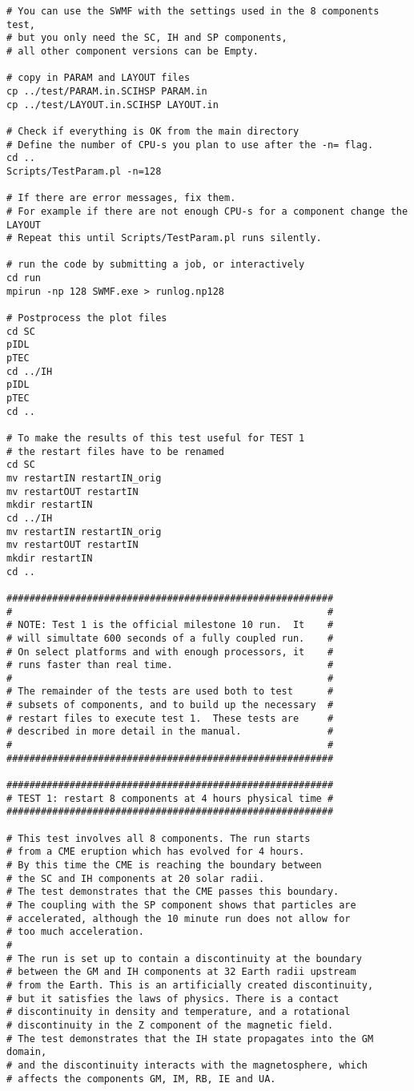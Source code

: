 \begin{verbatim}
# You can use the SWMF with the settings used in the 8 components test, 
# but you only need the SC, IH and SP components,
# all other component versions can be Empty.

# copy in PARAM and LAYOUT files
cp ../test/PARAM.in.SCIHSP PARAM.in
cp ../test/LAYOUT.in.SCIHSP LAYOUT.in

# Check if everything is OK from the main directory
# Define the number of CPU-s you plan to use after the -n= flag.
cd ..
Scripts/TestParam.pl -n=128

# If there are error messages, fix them. 
# For example if there are not enough CPU-s for a component change the LAYOUT
# Repeat this until Scripts/TestParam.pl runs silently.

# run the code by submitting a job, or interactively
cd run
mpirun -np 128 SWMF.exe > runlog.np128

# Postprocess the plot files
cd SC
pIDL
pTEC
cd ../IH
pIDL
pTEC
cd ..

# To make the results of this test useful for TEST 1
# the restart files have to be renamed
cd SC
mv restartIN restartIN_orig
mv restartOUT restartIN
mkdir restartIN
cd ../IH
mv restartIN restartIN_orig
mv restartOUT restartIN
mkdir restartIN
cd ..

#########################################################
#                                                       #
# NOTE: Test 1 is the official milestone 10 run.  It    #
# will simultate 600 seconds of a fully coupled run.    #
# On select platforms and with enough processors, it    #
# runs faster than real time.                           #
#                                                       #
# The remainder of the tests are used both to test      #
# subsets of components, and to build up the necessary  #
# restart files to execute test 1.  These tests are     #
# described in more detail in the manual.               #
#                                                       #
#########################################################

#########################################################
# TEST 1: restart 8 components at 4 hours physical time #
#########################################################

# This test involves all 8 components. The run starts 
# from a CME eruption which has evolved for 4 hours.
# By this time the CME is reaching the boundary between
# the SC and IH components at 20 solar radii.
# The test demonstrates that the CME passes this boundary.
# The coupling with the SP component shows that particles are
# accelerated, although the 10 minute run does not allow for
# too much acceleration.
#
# The run is set up to contain a discontinuity at the boundary
# between the GM and IH components at 32 Earth radii upstream
# from the Earth. This is an artificially created discontinuity, 
# but it satisfies the laws of physics. There is a contact
# discontinuity in density and temperature, and a rotational
# discontinuity in the Z component of the magnetic field.
# The test demonstrates that the IH state propagates into the GM domain,
# and the discontinuity interacts with the magnetosphere, which
# affects the components GM, IM, RB, IE and UA.


\end{verbatim}
